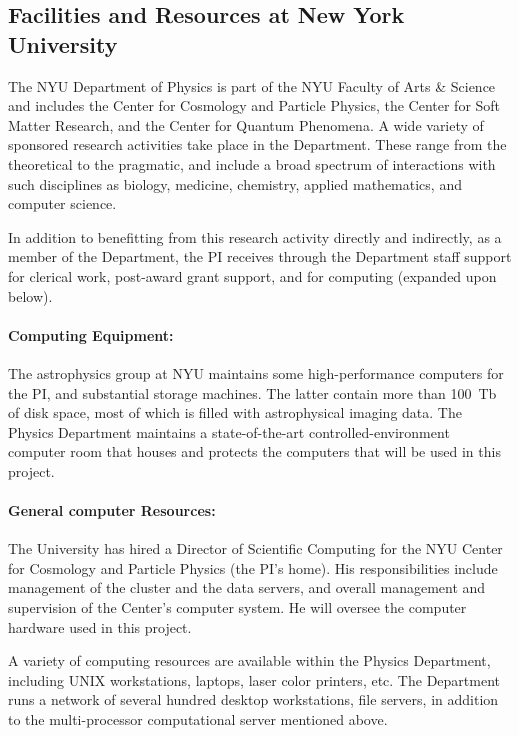 \documentclass[12pt]{article}
\begin{document}
\sloppy\sloppypar\thispagestyle{empty}

\subsection*{Facilities and Resources at New York University}

The NYU Department of Physics is part of the NYU Faculty of Arts \&
Science and includes the Center for Cosmology and Particle Physics,
the Center for Soft Matter Research, and the Center for Quantum Phenomena.
A wide variety of sponsored
research activities take place in the Department.  These range from
the theoretical to the pragmatic, and include a broad spectrum of
interactions with such disciplines as biology, medicine, chemistry,
applied mathematics, and computer science.

In addition to benefitting from this research activity directly and
indirectly, as a member of the Department, the PI receives through the
Department staff support for clerical work, post-award grant support,
and for computing (expanded upon below).

\paragraph{Computing Equipment:}

The astrophysics group at NYU maintains some high-performance computers
for the PI, and substantial storage machines.
The latter contain more than 100~Tb of disk space, most of which is filled
with astrophysical imaging data.  The Physics Department maintains a
state-of-the-art controlled-environment computer room that houses and
protects the computers that will be used in this project.

\paragraph{General computer Resources:}

The University has hired a Director of Scientific Computing for the
NYU Center for Cosmology and Particle Physics (the PI's home).  His
responsibilities include management of the cluster and the data
servers, and overall management and supervision of the Center's
computer system.  He will oversee the computer hardware used in this
project.

A variety of computing resources are available within the Physics
Department, including UNIX workstations, laptops, laser color
printers, etc.  The Department runs a network of several hundred
desktop workstations, file servers, in addition to the multi-processor
computational server mentioned above.
\end{document}
